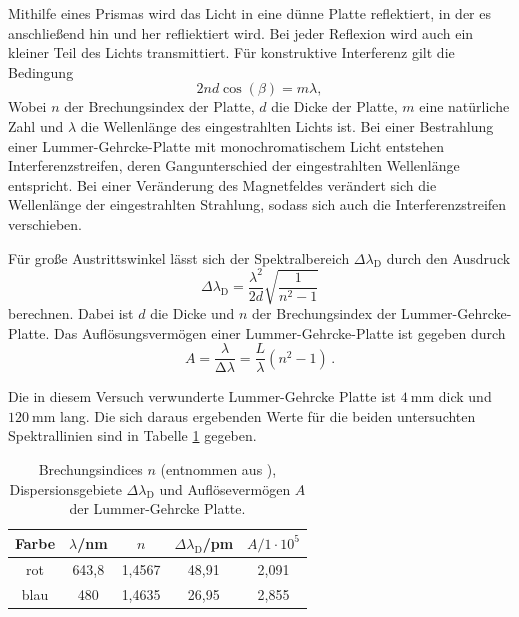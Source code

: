 Mithilfe eines Prismas wird das Licht in eine dünne Platte reflektiert, in der
es anschließend hin und her refliektiert wird. Bei jeder Reflexion wird auch ein kleiner
Teil des Lichts transmittiert. Für konstruktive Interferenz gilt die Bedingung
\begin{equation}
  2n d \cos(\beta)=m \lambda,
\end{equation}
Wobei $n$ der Brechungsindex der Platte, $d$ die Dicke der Platte, $m$ eine natürliche
Zahl und $\lambda$ die Wellenlänge des eingestrahlten Lichts ist. Bei einer Bestrahlung einer
Lummer-Gehrcke-Platte mit monochromatischem Licht entstehen Interferenzstreifen, deren
Gangunterschied der eingestrahlten Wellenlänge entspricht. Bei einer Veränderung
des Magnetfeldes verändert sich die Wellenlänge der eingestrahlten Strahlung, sodass
sich auch die Interferenzstreifen verschieben.

Für große Austrittswinkel lässt sich der Spektralbereich $\Delta \lambda_\text{D}$ durch
den Ausdruck
\begin{equation}
   \Delta \lambda_\text{D} = \frac{\lambda^2}{2d} \sqrt{\frac{1}{n^2-1}}
   \label{eqn:deltaLambdaD}
\end{equation}
berechnen. Dabei ist $d$ die Dicke und $n$ der Brechungsindex der Lummer-Gehrcke-Platte.
Das Auflösungsvermögen einer Lummer-Gehrcke-Platte ist gegeben durch
\begin{equation}
  A = \frac{\lambda}{\increment \lambda} = \frac{L}{\lambda}(n^2-1) \,.
\end{equation}

Die in diesem Versuch verwunderte Lummer-Gehrcke Platte ist $\SI{4}{\milli\meter}$ dick und $\SI{120}{\milli\meter}$ lang.
Die sich daraus ergebenden Werte für die beiden untersuchten Spektrallinien sind in Tabelle \ref{tab:lummer} gegeben.

\begin{table}[htp]
	\begin{center}
    \caption{Brechungsindices $n$ (entnommen aus \cite{Versuchsanleitung}), Dispersionsgebiete $\Delta \lambda_\text{D}$ und Auflösevermögen $A$ der Lummer-Gehrcke Platte.}
    \label{tab:lummer}
		\begin{tabular}{ccccc}
		\toprule
			{Farbe} & {$\lambda$/nm} & {$n$} & {$\Delta \lambda_\text{D}$/pm} & {$A/1\cdot10^5$}\\
			\midrule
			 rot  &  643,8 & 1,4567 & 48,91 & 2,091\\
			 blau &  480   & 1,4635 & 26,95 & 2,855\\
		\bottomrule
		\end{tabular}
	\end{center}
\end{table}

